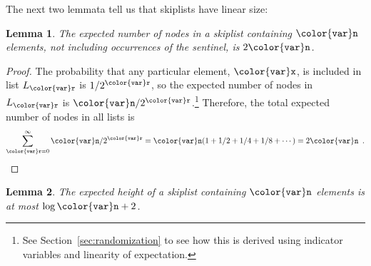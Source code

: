 \documentclass[10pt]{book}
\newcommand{\secref}[1]{Section~\ref{sec:#1}}
\theoremstyle{plain}
\newtheorem{lem}{Lemma}[chapter]
\newcommand{\lemlabel}[1]{\label{lem:#1}}
\theoremstyle{definition}
\begin{document}
The next two lemmata tell us that skiplists have linear size:

\begin{lem}\lemlabel{skiplist-size1}
  The expected number of nodes in a skiplist containing $\ensuremath{\mathtt{{\color{var}n}}}$ elements,
  not including occurrences of the sentinel, is $2\ensuremath{\mathtt{{\color{var}n}}}$.
\end{lem}

\begin{proof}
  The probability that any particular element, \ensuremath{\mathtt{{\color{var}x}}}, is included in list
  $L_{\ensuremath{\mathtt{{\color{var}r}}}}$ is $1/2^{\ensuremath{\mathtt{{\color{var}r}}}}$, so the expected number of nodes in $L_{\ensuremath{\mathtt{{\color{var}r}}}}$
  is $\ensuremath{\mathtt{{\color{var}n}}}/2^{\ensuremath{\mathtt{{\color{var}r}}}}$.\footnote{See \secref{randomization} to see how this
  is derived using indicator variables and linearity of expectation.}
  Therefore, the total expected number of nodes in all lists is
  \[ \sum_{\ensuremath{\mathtt{{\color{var}r}}}=0}^\infty \ensuremath{\mathtt{{\color{var}n}}}/2^{\ensuremath{\mathtt{{\color{var}r}}}} = \ensuremath{\mathtt{{\color{var}n}}}(1+1/2+1/4+1/8+\cdots) = 2\ensuremath{\mathtt{{\color{var}n}}} \enspace . \qedhere \]
\end{proof}

\begin{lem}\lemlabel{skiplist-height}
  The expected height of a skiplist containing \ensuremath{\mathtt{{\color{var}n}}} elements is at most
  $\log \ensuremath{\mathtt{{\color{var}n}}} + 2$.
\end{lem}
\end{document}
